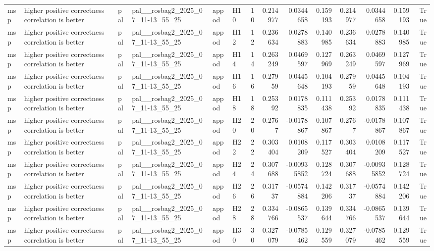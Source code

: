 \begin{longtable}{llllllrrrrrrrr}
msp & higher positive correctness correlation is better & pal & pal\_\_rosbag2\_2025\_07\_11-13\_55\_25 & appod & H10 & 10 & 0.214977 & 0.0344658 & 0.159193 & 0.214977 & 0.0344658 & 0.159193 & True \\
msp & higher positive correctness correlation is better & pal & pal\_\_rosbag2\_2025\_07\_11-13\_55\_25 & appod & H12 & 12 & 0.236634 & 0.0278883 & 0.140985 & 0.236634 & 0.0278883 & 0.140985 & True \\
msp & higher positive correctness correlation is better & pal & pal\_\_rosbag2\_2025\_07\_11-13\_55\_25 & appod & H14 & 14 & 0.263249 & 0.0469597 & 0.127969 & 0.263249 & 0.0469597 & 0.127969 & True \\
msp & higher positive correctness correlation is better & pal & pal\_\_rosbag2\_2025\_07\_11-13\_55\_25 & appod & H16 & 16 & 0.27959 & 0.0445648 & 0.104193 & 0.27959 & 0.0445648 & 0.104193 & True \\
msp & higher positive correctness correlation is better & pal & pal\_\_rosbag2\_2025\_07\_11-13\_55\_25 & appod & H18 & 18 & 0.25392 & 0.0178835 & 0.111438 & 0.25392 & 0.0178835 & 0.111438 & True \\
msp & higher positive correctness correlation is better & pal & pal\_\_rosbag2\_2025\_07\_11-13\_55\_25 & appod & H20 & 20 & 0.2767 & -0.0178867 & 0.107867 & 0.2767 & -0.0178867 & 0.107867 & True \\
msp & higher positive correctness correlation is better & pal & pal\_\_rosbag2\_2025\_07\_11-13\_55\_25 & appod & H22 & 22 & 0.303404 & 0.0108209 & 0.117527 & 0.303404 & 0.0108209 & 0.117527 & True \\
msp & higher positive correctness correlation is better & pal & pal\_\_rosbag2\_2025\_07\_11-13\_55\_25 & appod & H24 & 24 & 0.307688 & -0.00935852 & 0.128724 & 0.307688 & -0.00935852 & 0.128724 & True \\
msp & higher positive correctness correlation is better & pal & pal\_\_rosbag2\_2025\_07\_11-13\_55\_25 & appod & H26 & 26 & 0.31737 & -0.0574884 & 0.142206 & 0.31737 & -0.0574884 & 0.142206 & True \\
msp & higher positive correctness correlation is better & pal & pal\_\_rosbag2\_2025\_07\_11-13\_55\_25 & appod & H28 & 28 & 0.334766 & -0.0865537 & 0.139644 & 0.334766 & -0.0865537 & 0.139644 & True \\
msp & higher positive correctness correlation is better & pal & pal\_\_rosbag2\_2025\_07\_11-13\_55\_25 & appod & H30 & 30 & 0.327079 & -0.0785462 & 0.129559 & 0.327079 & -0.0785462 & 0.129559 & True \\

\end{longtable}
